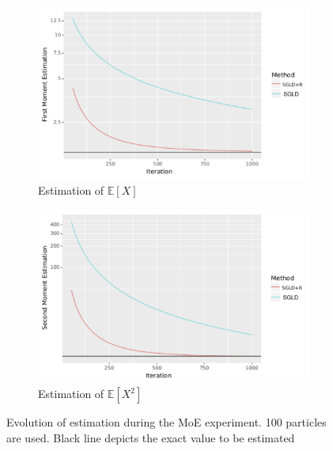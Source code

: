 \begin{figure}[!htb]
    \centering
    \begin{subfigure}[b]{0.45\textwidth}
        \includegraphics[width=\textwidth]{img/exp1.pdf}
        \caption{Estimation of $\mathbb{E}\left[X\right]$}
        \label{fig:gull}
    \end{subfigure}
    \begin{subfigure}[b]{0.45\textwidth}
        \includegraphics[width=\textwidth]{img/exp2.pdf}
        \caption{Estimation of $\mathbb{E}\left[X^2\right]$}
        \label{fig:tiger}
    \end{subfigure}
    \caption{Evolution of estimation during the MoE experiment. 100 particles are used. Black line depicts the exact value to be estimated}\label{fig:moe100}
\end{figure}



